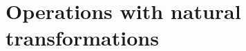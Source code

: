 \section{Operations with natural transformations}

\begin{example}
\label{ex:fun_category}











\end{example}
